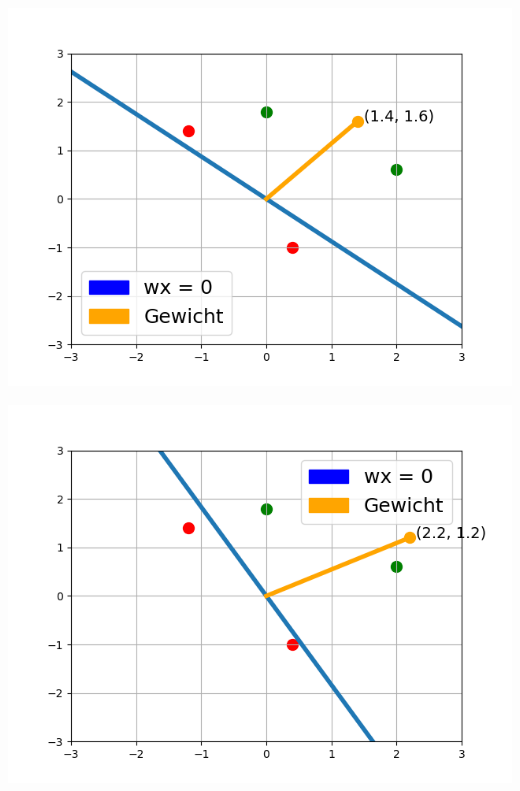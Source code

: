 \documentclass[fontsize=11pt]{scrartcl}
\newenvironment{Figure}
  {\par\medskip\noindent\minipage{\linewidth}}
  {\endminipage\par\medskip}
\begin{document}
                        \begin{Figure}
                            \begin{minipage}[b]{.4\linewidth}
                                \includegraphics[scale=0.5]{bsp3.png}
                            \end{minipage}
                            \hspace{.1\linewidth}
                            \begin{minipage}[b]{.4\linewidth}
                                \includegraphics[scale=0.5]{bsp4.png}
                            \end{minipage}     
                        \end{Figure}
\end{document}
